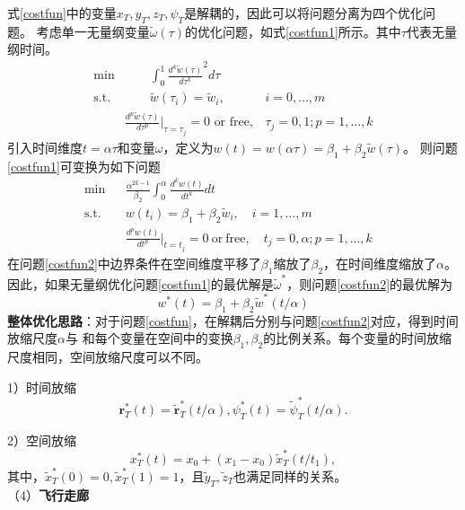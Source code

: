 式\ref{costfun}中的变量$x_T,y_T,z_T,\psi_T$是解耦的，因此可以将问题分离为四个优化问题。
考虑单一无量纲变量$\tilde{\omega}(\tau)$的优化问题，如式\ref{costfun1}所示。其中$\tau$代表无量纲时间。
\begin{equation}
    \begin{aligned}\label{costfun1}
    \text{min}&\quad\quad\int_0^1\frac{d^k\tilde{w}(\tau)}{d\tau^k}^2d\tau\\
    \text{s.t.}&\quad\quad\tilde{w}(\tau_i)=\tilde{w}_i,&i=0,...,m\\
    \quad&\frac{d^p\tilde{w}(\tau)}{d\tau^p}|_{\tau=\tau_j}=0\text{ or free},&\tau_j=0,1; p=1,...,k
\end{aligned}
\end{equation}
引入时间维度$t=\alpha \tau$和变量$\omega$，定义为$w(t)=w(\alpha\tau)=\beta_1+\beta_2\tilde{w}(\tau)$。
则问题\ref{costfun1}可变换为如下问题
\begin{equation}
\begin{aligned}\label{costfun2}
    &\text{min}&&\frac{\alpha^{2k-1}}{\beta_{2}}\int_{0}^{\alpha}\frac{d^{k}w(t)}{dt^{k}}dt&&\\
    &\text{s.t.}&&w(t_{i})=\beta_{1}+\beta_{2}\tilde{w}_{i},\quad i=1,...,m\\
    &&&\frac{d^{p}w(t)}{dt^{p}}|_{t=t_{j}}=0\mathrm{~or~free},\quad t_{j}=0,\alpha; p=1,...,k
\end{aligned}
\end{equation}
在问题\ref{costfun2}中边界条件在空间维度平移了$\beta_1$缩放了$\beta_2$，在时间维度缩放了$\alpha$。
因此，如果无量纲优化问题\ref{costfun1}的最优解是$\tilde{\omega}^*$，则问题\ref{costfun2}的最优解为
\begin{equation}
    w^*(t)=\beta_1+\beta_2\tilde{w}^*\left(t/\alpha\right)
\end{equation}
\textbf{整体优化思路}：对于问题\ref{costfun}，在解耦后分别与问题\ref{costfun2}对应，得到时间放缩尺度$\alpha$与
和每个变量在空间中的变换$\beta_1,\beta_2$的比例关系。每个变量的时间放缩尺度相同，空间放缩尺度可以不同。


1）时间放缩
\begin{equation}
    \mathbf{r}_T^*(t)=\mathbf{\tilde{r}}_T^*(t/\alpha), \psi_T^*(t)=\tilde{\psi}_T^*(t/\alpha).
\end{equation}


2）空间放缩
\begin{equation}
    x_T^*(t)=x_0+(x_1-x_0)\tilde{x}_T^*(t/t_1),
\end{equation}
其中，$\tilde{x}_T^*(0)=0,\tilde{x}_T^*(1)=1$，且$\tilde{y}_T,\tilde{z}_T$也满足同样的关系。\\
（4）\textbf{飞行走廊}


